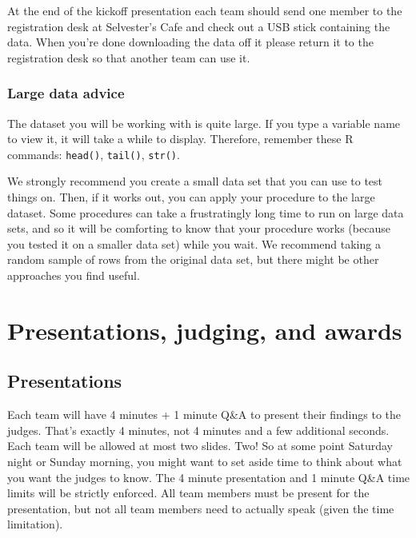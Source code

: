 \documentclass[]{article}
\begin{document}
At the end of the kickoff presentation each team should send one member
to the registration desk at Selvester's Cafe and check out a USB stick
containing the data. When you're done downloading the data off it please
return it to the registration desk so that another team can use it.

\hypertarget{large-data-advice}{%
\subsubsection{Large data advice}\label{large-data-advice}}

The dataset you will be working with is quite large. If you type a
variable name to view it, it will take a while to display. Therefore,
remember these R commands: \texttt{head()}, \texttt{tail()},
\texttt{str()}.

We strongly recommend you create a small data set that you can use to
test things on. Then, if it works out, you can apply your procedure to
the large dataset. Some procedures can take a frustratingly long time to
run on large data sets, and so it will be comforting to know that your
procedure works (because you tested it on a smaller data set) while you
wait. We recommend taking a random sample of rows from the original data
set, but there might be other approaches you find useful.

\hypertarget{presentations-judging-and-awards}{%
\section{Presentations, judging, and
awards}\label{presentations-judging-and-awards}}

\hypertarget{presentations}{%
\subsection{Presentations}\label{presentations}}

Each team will have 4 minutes + 1 minute Q\&A to present their findings
to the judges. That's exactly 4 minutes, not 4 minutes and a few
additional seconds. Each team will be allowed at most two slides. Two!
So at some point Saturday night or Sunday morning, you might want to set
aside time to think about what you want the judges to know. The 4 minute
presentation and 1 minute Q\&A time limits will be strictly enforced.
All team members must be present for the presentation, but not all team
members need to actually speak (given the time limitation).
\end{document}
